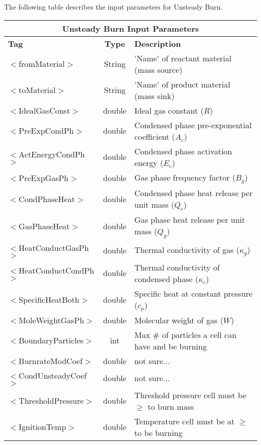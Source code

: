 The following table describes the input parameters for Unsteady Burn.

\begin{center}
\begin{tabular}{| l | c | p{7cm} |}
\hline  
  \multicolumn{3}{|c|}{\textbf{Unsteady Burn Input Parameters}} \\
\hline
\hline
  \textbf{Tag} & \textbf{Type} & \textbf{Description}\\
\hline
  $<$fromMaterial$>$ & String & 'Name' of reactant material (mass source)\\
\hline
  $<$toMaterial$>$ & String & 'Name' of product material (mass sink)\\
\hline
  $<$IdealGasConst$>$ & double & Ideal gas constant ($R$)\\
\hline
  $<$PreExpCondPh$>$ & double & Condensed phase pre-exponential coefficient ($A_c$) \\
\hline
  $<$ActEnergyCondPh$>$ & double & Condensed phase activation energy ($E_c$)\\
\hline
  $<$PreExpGasPh$>$ & double & Gas phase frequency factor ($B_g$)\\
\hline
  $<$CondPhaseHeat$>$ & double & Condensed phase heat release per unit mass ($Q_c$)\\
\hline
  $<$GasPhaseHeat$>$ & double & Gas phase heat release per unit mass ($Q_g$)\\
\hline
  $<$HeatConductGasPh$>$ & double & Thermal conductivity of gas ($\kappa_g$)\\
\hline
  $<$HeatConductCondPh$>$ & double & Thermal conductivity of condensed phase ($\kappa_c$)\\
\hline
  $<$SpecificHeatBoth$>$ & double & Specific heat at constant pressure ($c_p$)\\
\hline
  $<$MoleWeightGasPh$>$ & double & Molecular weight of gas ($W$)\\
\hline
  $<$BoundaryParticles$>$ & int & Max \# of particles a cell can have and be burning\\
\hline
  $<$BurnrateModCoef$>$ & double & not sure... \\
\hline
  $<$CondUnsteadyCoef$>$ & double & not sure... \\
\hline
  $<$ThresholdPressure$>$ & double & Threshold pressure cell must be $\ge$ to burn mass\\
\hline
  $<$IgnitionTemp$>$ & double & Temperature cell must be at $\ge$ to be burning\\
\hline
\end{tabular}
\end{center}

